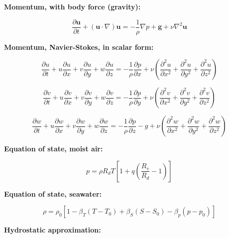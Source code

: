 \documentclass[12pt]{article}
\numberwithin{equation}{section}
\numberwithin{figure}{section}
\numberwithin{table}{section}
\begin{document}
\textbf{Momentum, with body force (gravity):}

\begin{equation}
  \frac{\partial \mathbf{u}}{\partial t} + (\mathbf{u} \cdot \nabla) \mathbf{u} =
  - \frac{1}{\rho} \nabla p + \mathbf{g} + \nu \nabla^2 \mathbf{u}
\end{equation}

\textbf{Momentum, Navier-Stokes, in scalar form:}

\begin{equation}
  \frac{\partial u}{\partial t} + 
  u \frac{\partial u}{\partial x} + 
  v \frac{\partial u}{\partial y} + 
  w \frac{\partial u}{\partial z} = 
  - \frac{1}{\rho} \frac{\partial p}{\partial x} + \nu \left( \frac{\partial^2 u}{\partial x^2} + \frac{\partial^2 u}{\partial y^2} + \frac{\partial^2 u}{\partial z^2} \right)
\end{equation}

\begin{equation}
  \frac{\partial v}{\partial t} + 
  u \frac{\partial v}{\partial x} + 
  v \frac{\partial v}{\partial y} + 
  w \frac{\partial v}{\partial z} = 
  - \frac{1}{\rho} \frac{\partial p}{\partial y} + \nu \left( \frac{\partial^2 v}{\partial x^2} + \frac{\partial^2 v}{\partial y^2} + \frac{\partial^2 v}{\partial z^2} \right)
\end{equation}

\begin{equation}
  \frac{\partial w}{\partial t} + 
  u \frac{\partial w}{\partial x} + 
  v \frac{\partial w}{\partial y} + 
  w \frac{\partial w}{\partial z} = 
  - \frac{1}{\rho} \frac{\partial p}{\partial z} - g + \nu \left( \frac{\partial^2 w}{\partial x^2} + \frac{\partial^2 w}{\partial y^2} + \frac{\partial^2 w}{\partial z^2} \right)
\end{equation}

\textbf{Equation of state, moist air:}

\begin{equation}
  p = \rho R_d T \left[1 + q \left(\frac{R_v}{R_d} - 1 \right) \right]
\end{equation}

\textbf{Equation of state, seawater:}

\begin{equation}
  \rho = \rho_0 \left[ 1 - \beta_T(T-T_0) + \beta_S(S-S_0) - \beta_p(p-p_0) \right]
\end{equation}

\textbf{Hydrostatic approximation:}
\end{document}
